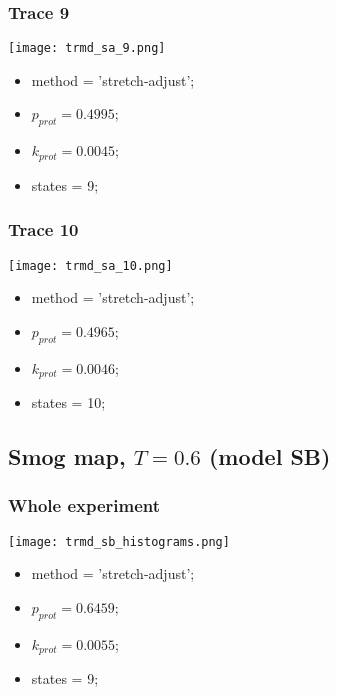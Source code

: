 \subsubsection{Trace 9}
\begin{minipage}[c]{0.7\textwidth}
    \texttt{[image: trmd\_sa\_9.png]}
\end{minipage}
\hfill
\begin{minipage}[c]{0.45\textwidth}
    \begin{itemize}
        \item method = 'stretch-adjust';
        \item $p_{prot}=0.4995$;
        \item $k_{prot}=0.0045$;
        \item states = 9;
    \end{itemize}
\end{minipage}

\subsubsection{Trace 10}
\begin{minipage}[c]{0.7\textwidth}
    \texttt{[image: trmd\_sa\_10.png]}
\end{minipage}
\hfill
\begin{minipage}[c]{0.45\textwidth}
    \begin{itemize}
        \item method = 'stretch-adjust';
        \item $p_{prot}=0.4965$;
        \item $k_{prot}=0.0046$;
        \item states = 10;
    \end{itemize}
\end{minipage}


\subsection{Smog map, $T=0.6$ (model SB)}
\subsubsection{Whole experiment}
\begin{minipage}[c]{0.7\textwidth}
    \texttt{[image: trmd\_sb\_histograms.png]}
\end{minipage}
\hfill
\begin{minipage}[c]{0.45\textwidth}
    \begin{itemize}
        \item method = 'stretch-adjust';
        \item $p_{prot}=0.6459$;
        \item $k_{prot}=0.0055$;
        \item states = 9;
    \end{itemize}
\end{minipage}

